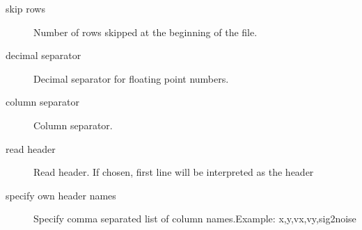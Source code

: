 \documentclass[letterpaper,10pt,english]{sphinxmanual}
\begin{document}
\begin{description}
\item[{skip rows}] \leavevmode
Number of rows skipped at the beginning of the file.

\item[{decimal separator}] \leavevmode
Decimal separator for floating point numbers.

\item[{column separator}] \leavevmode
Column separator.

\item[{read header}] \leavevmode
Read header. If chosen, first line will be interpreted as the header

\item[{specify own header names}] \leavevmode
Specify comma separated list of column names.Example: x,y,vx,vy,sig2noise

\end{description}
\end{document}
